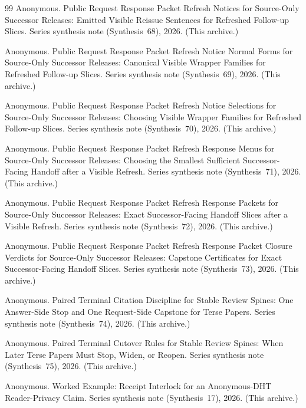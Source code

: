 \documentclass[11pt]{article}
\begin{document}
\begin{thebibliography}{99}
Anonymous.
\newblock Public Request Response Packet Refresh Notices for Source-Only Successor Releases: Emitted Visible Reissue Sentences for Refreshed Follow-up Slices.
\newblock Series synthesis note (Synthesis~68), 2026. (This archive.)

Anonymous.
\newblock Public Request Response Packet Refresh Notice Normal Forms for Source-Only Successor Releases: Canonical Visible Wrapper Families for Refreshed Follow-up Slices.
\newblock Series synthesis note (Synthesis~69), 2026. (This archive.)

Anonymous.
\newblock Public Request Response Packet Refresh Notice Selections for Source-Only Successor Releases: Choosing Visible Wrapper Families for Refreshed Follow-up Slices.
\newblock Series synthesis note (Synthesis~70), 2026. (This archive.)

Anonymous.
\newblock Public Request Response Packet Refresh Response Menus for Source-Only Successor Releases: Choosing the Smallest Sufficient Successor-Facing Handoff after a Visible Refresh.
\newblock Series synthesis note (Synthesis~71), 2026. (This archive.)

Anonymous.
\newblock Public Request Response Packet Refresh Response Packets for Source-Only Successor Releases: Exact Successor-Facing Handoff Slices after a Visible Refresh.
\newblock Series synthesis note (Synthesis~72), 2026. (This archive.)


Anonymous.
\newblock Public Request Response Packet Refresh Response Packet Closure Verdicts for Source-Only Successor Releases: Capstone Certificates for Exact Successor-Facing Handoff Slices.
\newblock Series synthesis note (Synthesis~73), 2026. (This archive.)

Anonymous.
\newblock Paired Terminal Citation Discipline for Stable Review Spines: One Answer-Side Stop and One Request-Side Capstone for Terse Papers.
\newblock Series synthesis note (Synthesis~74), 2026. (This archive.)

Anonymous.
\newblock Paired Terminal Cutover Rules for Stable Review Spines: When Later Terse Papers Must Stop, Widen, or Reopen.
\newblock Series synthesis note (Synthesis~75), 2026. (This archive.)

Anonymous.
\newblock Worked Example: Receipt Interlock for an Anonymous-DHT Reader-Privacy Claim.
\newblock Series synthesis note (Synthesis~17), 2026. (This archive.)

\end{thebibliography}
\end{document}

